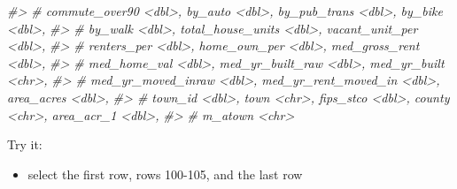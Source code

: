 \documentclass[
]{book}
\newenvironment{Shaded}{\begin{snugshade}}{\end{snugshade}}
\newcommand{\CommentTok}[1]{\textcolor[rgb]{0.56,0.35,0.01}{\textit{#1}}}
\providecommand{\tightlist}{%
  \setlength{\itemsep}{0pt}\setlength{\parskip}{0pt}}
\begin{document}
\begin{Shaded}
\begin{Highlighting}[]
\CommentTok{\#\textgreater{} \#   commute\_over90 \textless{}dbl\textgreater{}, by\_auto \textless{}dbl\textgreater{}, by\_pub\_trans \textless{}dbl\textgreater{}, by\_bike \textless{}dbl\textgreater{},}
\CommentTok{\#\textgreater{} \#   by\_walk \textless{}dbl\textgreater{}, total\_house\_units \textless{}dbl\textgreater{}, vacant\_unit\_per \textless{}dbl\textgreater{},}
\CommentTok{\#\textgreater{} \#   renters\_per \textless{}dbl\textgreater{}, home\_own\_per \textless{}dbl\textgreater{}, med\_gross\_rent \textless{}dbl\textgreater{},}
\CommentTok{\#\textgreater{} \#   med\_home\_val \textless{}dbl\textgreater{}, med\_yr\_built\_raw \textless{}dbl\textgreater{}, med\_yr\_built \textless{}chr\textgreater{},}
\CommentTok{\#\textgreater{} \#   med\_yr\_moved\_inraw \textless{}dbl\textgreater{}, med\_yr\_rent\_moved\_in \textless{}dbl\textgreater{}, area\_acres \textless{}dbl\textgreater{},}
\CommentTok{\#\textgreater{} \#   town\_id \textless{}dbl\textgreater{}, town \textless{}chr\textgreater{}, fips\_stco \textless{}dbl\textgreater{}, county \textless{}chr\textgreater{}, area\_acr\_1 \textless{}dbl\textgreater{},}
\CommentTok{\#\textgreater{} \#   m\_atown \textless{}chr\textgreater{}}
\end{Highlighting}
\end{Shaded}

Try it:

\begin{itemize}
\tightlist
\item
  select the first row, rows 100-105, and the last row
\end{itemize}
\end{document}
